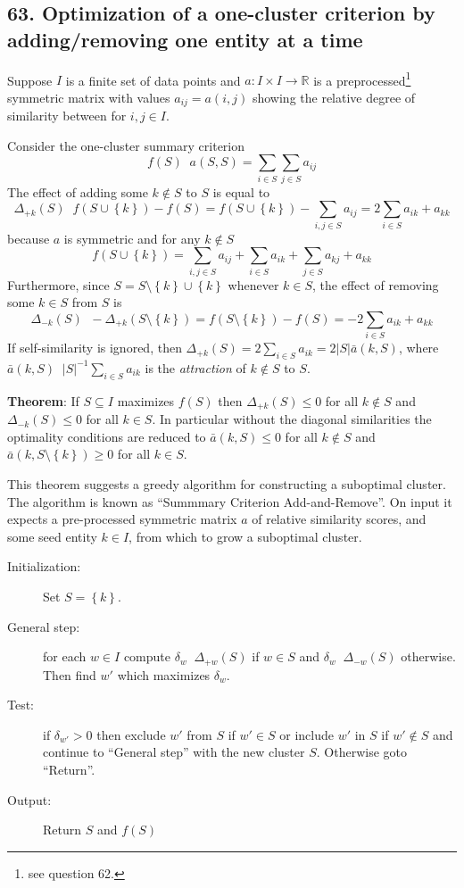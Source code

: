 \documentclass[a4paper]{article}
\newcommand{\obj}[1]{{\left\{ #1 \right \}}}
\newcommand{\brac}[1]{{\left ( #1 \right )}}
\newcommand{\abs}[1]{{\left | #1 \right |}}
\newcommand{\Real}{\mathbb{R}}
\newcommand{\defn}{\mathop{\overset{\Delta}{=}}\nolimits}
\begin{document}


\subsection*{63. Optimization of a one-cluster criterion by adding/removing one entity at a time} %
\label{sub:question_63}
Suppose $I$ is a finite set of data points and $a:I\times I \to \Real$ is a preprocessed\footnote{see question 62.} symmetric matrix with values $a_{ij} = a(i,j)$ showing the relative degree of similarity between for $i,j\in I$.

Consider the one-cluster summary criterion \[f(S)\defn a(S,S) = \sum_{i\in S}\sum_{j\in S} a_{ij}\] The effect of adding some $k\notin S$ to $S$ is equal to \[\Delta_{+k}(S) \defn f\brac{S\cup\obj{k}} - f(S) = f\brac{S\cup\obj{k}} - \sum_{i,j\in S} a_{ij} = 2 \sum_{i\in S} a_{ik} + a_{kk}\] because $a$ is symmetric and for any $k\notin S$ \[ f\brac{S\cup\obj{k}} = \sum_{i,j\in S} a_{ij} + \sum_{i\in S} a_{ik} + \sum_{j\in S} a_{kj} + a_{kk}\] Furthermore, since $S = S\setminus\obj{k} \cup \obj{k}$ whenever $k\in S$, the effect of removing some $k\in S$ from $S$ is \[\Delta_{-k}\brac{S} \defn -\Delta_{+k}\brac{S\setminus\obj{k}} = f\brac{S\setminus\obj{k}} - f(S) = - 2 \sum_{i\in S} a_{ik} + a_{kk}\] If self-similarity is ignored, then $\Delta_{+k}(S) = 2 \sum_{i\in S} a_{ik} = 2\abs{S}\bar{a}(k,S)$, where $\bar{a}(k,S) \defn \abs{S}^{-1} \sum_{i\in S} a_{ik}$ is the \emph{attraction} of $k\notin S$ to $S$.

\noindent\textbf{Theorem}: If $S\subseteq I$ maximizes $f(S)$ then $\Delta_{+k}(S) \leq 0$ for all $k\notin S$ and $\Delta_{-k}\brac{S} \leq 0$ for all $k\in S$. In particular without the diagonal similarities the optimality conditions are reduced to $\bar{a}(k,S)\leq 0$ for all $k\notin S$ and $\bar{a}\brac{k,S\setminus\obj{k}}\geq 0$ for all $k\in S$.

This theorem suggests a greedy algorithm for constructing a suboptimal cluster. The algorithm is known as ``Summmary Criterion Add-and-Remove''. On input it expects a pre-processed symmetric matrix $a$ of relative similarity scores, and some seed entity $k\in I$, from which to grow a suboptimal cluster.
\begin{description}
	\item[Initialization:] Set $S = \obj{k}$. 
	\item[General step:] for each $w\in I$ compute $\delta_w \defn \Delta_{+w}(S)$ if $w\in S$ and $\delta_w \defn \Delta_{-w}(S)$ otherwise. Then find $w'$ which maximizes $\delta_w$.
	\item[Test:] if $\delta_{w'} > 0$ then exclude $w'$ from $S$ if $w'\in S$ or include $w'$ in $S$ if $w'\notin S$ and continue to ``General step'' with the new cluster $S$. Otherwise goto ``Return''.
	\item[Output:] Return $S$ and $f(S)$
\end{description}
\end{document}
